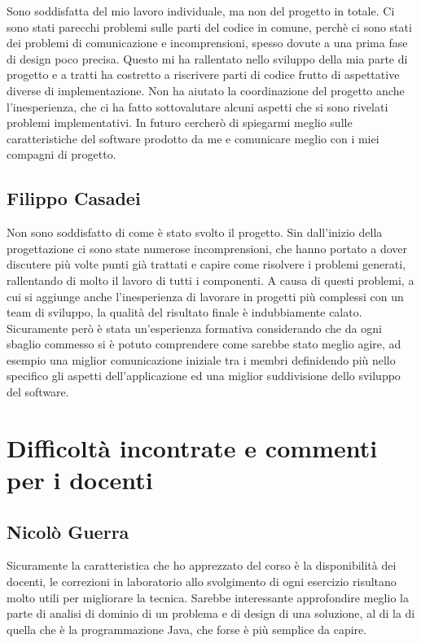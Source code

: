 \documentclass[a4paper,12pt]{report}
\begin{document}
Sono soddisfatta del mio lavoro individuale, ma non del progetto in totale. Ci sono stati parecchi problemi sulle parti del codice in comune, 
perchè ci sono stati dei problemi di comunicazione e incomprensioni, spesso dovute a una prima fase di design poco precisa. Questo mi ha rallentato nello sviluppo della mia parte di progetto e a tratti ha costretto a riscrivere parti di codice frutto di aspettative diverse di implementazione. 
Non ha aiutato la coordinazione del progetto anche l'inesperienza, che ci ha fatto sottovalutare alcuni aspetti che si sono rivelati problemi implementativi. 
In futuro cercherò di spiegarmi meglio sulle caratteristiche del software prodotto da me e comunicare meglio con i miei compagni di progetto. 

\subsection{Filippo Casadei}
Non sono soddisfatto di come è stato svolto il progetto. Sin dall'inizio della progettazione ci sono state numerose incomprensioni, che hanno portato a dover discutere più volte punti già trattati e capire come risolvere i problemi generati,
rallentando di molto il lavoro di tutti i componenti. A causa di questi problemi, a cui si aggiunge anche l'inesperienza di lavorare in progetti più complessi con un team di sviluppo, la qualità del risultato finale è indubbiamente calato. 
Sicuramente però è stata un'esperienza formativa considerando che da ogni sbaglio commesso si è potuto comprendere come sarebbe stato meglio agire, ad esempio una miglior comunicazione
iniziale tra i membri definidendo più nello specifico gli aspetti dell'applicazione ed una miglior suddivisione dello sviluppo del software. 

\section{Difficoltà incontrate e commenti per i docenti}
\subsection{Nicolò Guerra}
Sicuramente la caratteristica che ho apprezzato del corso è la disponibilità dei docenti, le correzioni in laboratorio allo svolgimento di ogni esercizio risultano molto utili per migliorare la tecnica.
Sarebbe interessante approfondire meglio la parte di analisi di dominio di un problema e di design di una soluzione, al di la di quella che è la programmazione Java, che forse è più semplice da capire.
\end{document}
